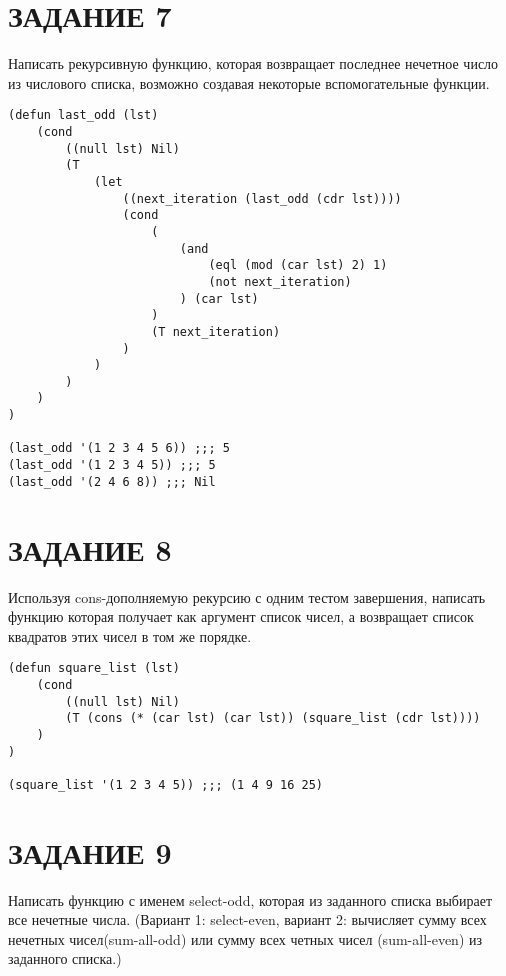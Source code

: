 \section{ЗАДАНИЕ 7}

Написать рекурсивную функцию, которая возвращает последнее нечетное
число из числового списка, возможно создавая некоторые
вспомогательные функции.

\begin{lstlisting}
(defun last_odd (lst)
    (cond
        ((null lst) Nil)
        (T
            (let
                ((next_iteration (last_odd (cdr lst))))
                (cond
                    (
                        (and
                            (eql (mod (car lst) 2) 1)
                            (not next_iteration)
                        ) (car lst)
                    )
                    (T next_iteration)
                )
            )
        )
    )
)

(last_odd '(1 2 3 4 5 6)) ;;; 5
(last_odd '(1 2 3 4 5)) ;;; 5
(last_odd '(2 4 6 8)) ;;; Nil
\end{lstlisting}

\section{ЗАДАНИЕ 8}

Используя cons-дополняемую рекурсию с одним тестом завершения,
написать функцию которая получает как аргумент список чисел,
а возвращает список квадратов этих чисел в том же порядке.

\begin{lstlisting}
(defun square_list (lst)
    (cond
        ((null lst) Nil)
        (T (cons (* (car lst) (car lst)) (square_list (cdr lst))))
    )
)

(square_list '(1 2 3 4 5)) ;;; (1 4 9 16 25)
\end{lstlisting}

\section{ЗАДАНИЕ 9}

Написать функцию с именем select-odd, которая из заданного
списка выбирает все нечетные числа. (Вариант 1: select-even,
вариант 2: вычисляет сумму всех нечетных чисел(sum-all-odd)
или сумму всех четных чисел (sum-all-even) из заданного списка.)

